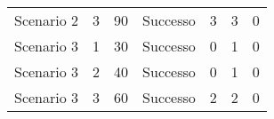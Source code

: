 {\begin{tabular}{lllllll}
	Scenario 2 & 3             & 90                 & Successo          & 3                                                                          & 3					& 0                                                                                \\
	Scenario 3 & 1             & 30                 & Successo          & 0                                                                          & 1					& 0                                                                                \\
	Scenario 3 & 2             & 40                 & Successo          & 0                                                                          & 1					& 0                                                                                \\
	Scenario 3 & 3             & 60                 & Successo          & 2                                                                          & 2					& 0                                                                                 \\
	\bottomrule
\end{tabular}

\vspace{1cm}


}
